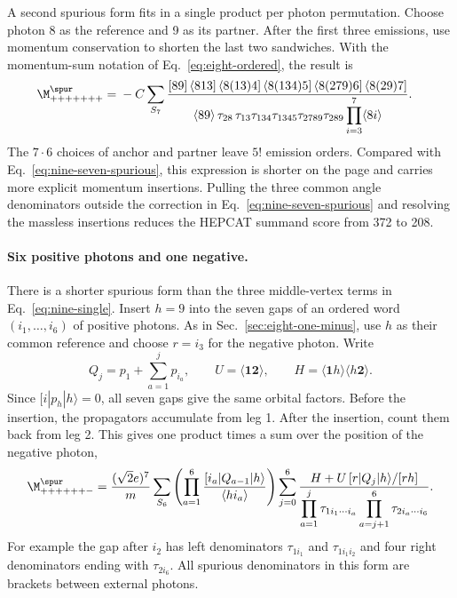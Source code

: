 A second spurious form fits in a single product per photon permutation.
Choose photon 8 as the reference and 9 as its partner. After the first
three emissions, use momentum conservation to shorten the last two
sandwiches. With the momentum-sum notation of
Eq.~\eqref{eq:eight-ordered}, the result is
\begin{align}
 \M^{\spur}_{+++++++}={}&-C\sum_{S_7}
 \frac{[89]\,\langle813]\,\langle8(13)4]\,\langle8(134)5]\,
                \langle8(279)6]\,\langle8(29)7]}
 {\langle89\rangle\,\tau_{28}\,
  \tau_{13}\tau_{134}\tau_{1345}\tau_{2789}\tau_{289}
  \displaystyle\prod_{i=3}^{7}\langle8i\rangle}.
 \label{eq:nine-seven-product}
\end{align}
The $7\cdot6$ choices of anchor and partner leave $5!$ emission orders.
Compared with Eq.~\eqref{eq:nine-seven-spurious}, this expression is
shorter on the page and carries more explicit momentum insertions.
Pulling the three common angle denominators outside the correction in
Eq.~\eqref{eq:nine-seven-spurious} and resolving the massless insertions
reduces the HEPCAT summand score from 372 to 208.

\paragraph{Six positive photons and one negative.}
There is a shorter spurious form than the three middle-vertex terms in
Eq.~\eqref{eq:nine-single}. Insert $h=9$ into the seven gaps of an
ordered word $(i_1,\ldots,i_6)$ of positive photons. As in
Sec.~\ref{sec:eight-one-minus}, use $h$ as their common reference and
choose $r=i_3$ for the negative photon. Write
\[
 Q_j=p_1+\sum_{a=1}^{j}p_{i_a},\qquad
 U=\langle\mathbf1\mathbf2\rangle,\qquad
 H=\langle\mathbf1h\rangle\langle h\mathbf2\rangle .
\]
Since $[i|p_h|h\rangle=0$, all seven gaps give the same orbital factors.
Before the insertion, the propagators accumulate from leg 1. After the
insertion, count them back from leg 2. This gives one product times a
sum over the position of the negative photon,
\begin{align}
 \M^{\spur}_{++++++-}
  =\frac{(\sqrt{2}e)^7}{m}\sum_{S_6}
  \left(\prod_{a=1}^{6}\frac{[i_a|Q_{a-1}|h\rangle}
                           {\langle h i_a\rangle}\right)
  \sum_{j=0}^{6}
  \frac{H+U\,[r|Q_j|h\rangle/[rh]}
       {\displaystyle\prod_{a=1}^{j}\tau_{1 i_1\cdots i_a}
        \prod_{a=j+1}^{6}\tau_{2 i_a\cdots i_6}} .
 \label{eq:nine-one-gaps}
\end{align}
For example the gap after $i_2$ has left denominators $\tau_{1i_1}$
and $\tau_{1i_1i_2}$ and four right denominators ending with
$\tau_{2i_6}$. All spurious denominators in this form are brackets
between external photons.

